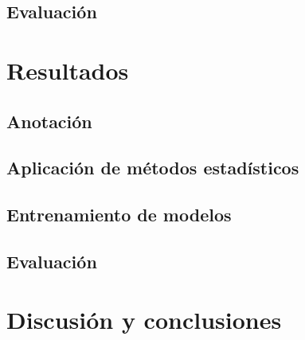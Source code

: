 \documentclass[colorinlistoftodos]{article}
\begin{document}
\subsection{Evaluaci\'on}


\section{Resultados}
\subsection{Anotación}
%
\subsection{Aplicación de m\'etodos estad\'isticos}

\subsection{Entrenamiento de modelos}

\subsection{Evaluaci\'on}


\section{Discusi\'on y conclusiones}




\listoftodos%
\end{document}
